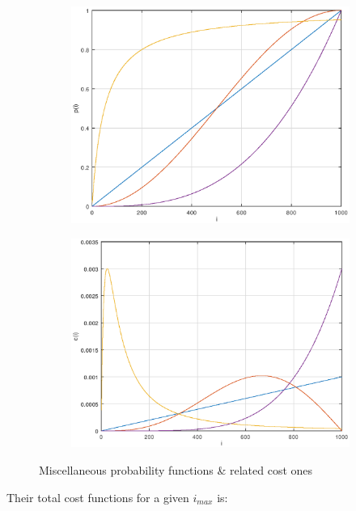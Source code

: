 \documentclass[10pt,a4paper]{article}
\begin{document}
	\begin{figure}[H]
		\begin{subfigure}{0.5\linewidth}
			\includegraphics[width=\linewidth]{FIG/miscp.png}
		\end{subfigure}
		\begin{subfigure}{0.5\linewidth}
			\includegraphics[width=\linewidth]{FIG/miscc.png}
		\end{subfigure}
		\caption{Miscellaneous probability functions \& related cost ones}
		\label{fig:misccp}
	\end{figure}
	Their total cost functions for a given $i_{max}$ is:
\end{document}

